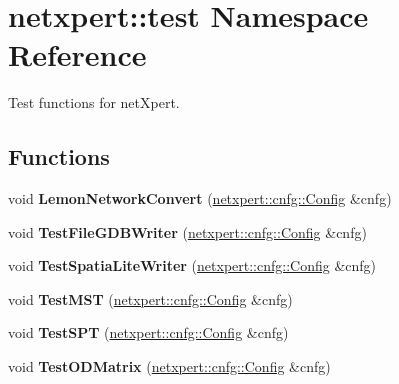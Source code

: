 \hypertarget{namespacenetxpert_1_1test}{}\section{netxpert\+:\+:test Namespace Reference}
\label{namespacenetxpert_1_1test}


Test functions for net\+Xpert.  


\subsection*{Functions}
\begin{DoxyCompactItemize}
\item 
void {\bfseries Lemon\+Network\+Convert} (\hyperlink{structnetxpert_1_1cnfg_1_1Config}{netxpert\+::cnfg\+::\+Config} \&cnfg)\hypertarget{namespacenetxpert_1_1test_a6ab89a7578eaa58858c9b6ac8185f9b8}{}\label{namespacenetxpert_1_1test_a6ab89a7578eaa58858c9b6ac8185f9b8}

\item 
void {\bfseries Test\+File\+G\+D\+B\+Writer} (\hyperlink{structnetxpert_1_1cnfg_1_1Config}{netxpert\+::cnfg\+::\+Config} \&cnfg)\hypertarget{namespacenetxpert_1_1test_afde24f807e0d5a62ebb574ff5c2f8ac3}{}\label{namespacenetxpert_1_1test_afde24f807e0d5a62ebb574ff5c2f8ac3}

\item 
void {\bfseries Test\+Spatia\+Lite\+Writer} (\hyperlink{structnetxpert_1_1cnfg_1_1Config}{netxpert\+::cnfg\+::\+Config} \&cnfg)\hypertarget{namespacenetxpert_1_1test_a2f87f466e48ebb54ea46e908f3a7c86b}{}\label{namespacenetxpert_1_1test_a2f87f466e48ebb54ea46e908f3a7c86b}

\item 
void {\bfseries Test\+M\+ST} (\hyperlink{structnetxpert_1_1cnfg_1_1Config}{netxpert\+::cnfg\+::\+Config} \&cnfg)\hypertarget{namespacenetxpert_1_1test_ac9f319b105ea2d0cf7d39f6398360b12}{}\label{namespacenetxpert_1_1test_ac9f319b105ea2d0cf7d39f6398360b12}

\item 
void {\bfseries Test\+S\+PT} (\hyperlink{structnetxpert_1_1cnfg_1_1Config}{netxpert\+::cnfg\+::\+Config} \&cnfg)\hypertarget{namespacenetxpert_1_1test_ae005f33c463847a2a953b40fa02dc4ec}{}\label{namespacenetxpert_1_1test_ae005f33c463847a2a953b40fa02dc4ec}

\item 
void {\bfseries Test\+O\+D\+Matrix} (\hyperlink{structnetxpert_1_1cnfg_1_1Config}{netxpert\+::cnfg\+::\+Config} \&cnfg)\hypertarget{namespacenetxpert_1_1test_aabc184f5bc5485098130be0f24261d45}{}\label{namespacenetxpert_1_1test_aabc184f5bc5485098130be0f24261d45}


\end{DoxyCompactItemize}

